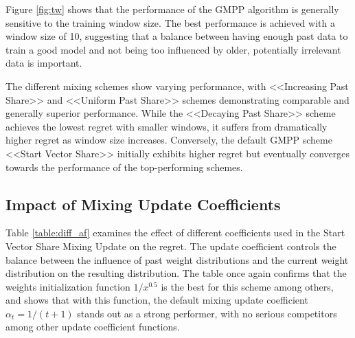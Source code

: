 \documentclass[12pt, twoside]{article}
\begin{document}
Figure \ref{fig:tw}  shows that the performance of the GMPP algorithm is generally sensitive to the training window size.
The best performance is achieved with a window size of 10, suggesting that a balance between having enough past data to train a good model and not being too influenced by older, potentially irrelevant data is important.

The different mixing schemes show varying performance, with <<Increasing Past Share>> and <<Uniform Past Share>> schemes demonstrating comparable and generally superior performance. While the <<Decaying Past Share>> scheme achieves the lowest regret with smaller windows, it suffers from dramatically higher regret as window size increases. Conversely, the default GMPP scheme <<Start Vector Share>> initially exhibits higher regret but eventually converges towards the performance of the top-performing schemes.


\subsection{Impact of Mixing Update Coefficients}

Table \ref{table:diff_af} examines the effect of different coefficients used in the Start Vector Share Mixing Update on the regret. 
The update coefficient controls the balance between the influence of past weight distributions and the current weight distribution on the resulting distribution. 
The table once again confirms that the weights initialization function $1/x^{0.5}$ is the best for this scheme among others, and shows that with this function, the default mixing update coefficient $\alpha_t = 1 / (t + 1)$ stands out as a strong performer, with no serious competitors among other update coefficient functions. 
\end{document}
